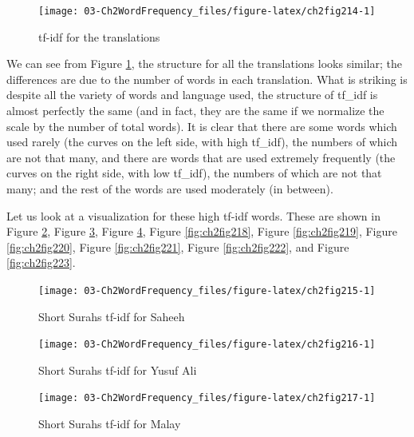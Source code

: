 \documentclass[
]{article}
\begin{document}
\normalsize

\begin{figure}

{\centering \texttt{[image: 03-Ch2WordFrequency\_files/figure-latex/ch2fig214-1]} 

}

\caption{tf-idf for the translations}\label{fig:ch2fig214}
\end{figure}

We can see from Figure \ref{fig:ch2fig214}, the structure for all the translations looks similar; the differences are due to the number of words in each translation. What is striking is despite all the variety of words and language used, the structure of tf\_idf is almost perfectly the same (and in fact, they are the same if we normalize the scale by the number of total words). It is clear that there are some words which used rarely (the curves on the left side, with high tf\_idf), the numbers of which are not that many, and there are words that are used extremely frequently (the curves on the right side, with low tf\_idf), the numbers of which are not that many; and the rest of the words are used moderately (in between).

Let us look at a visualization for these high tf-idf words. These are shown in Figure \ref{fig:ch2fig215}, Figure \ref{fig:ch2fig216}, Figure \ref{fig:ch2fig217}, Figure \ref{fig:ch2fig218}, Figure \ref{fig:ch2fig219}, Figure \ref{fig:ch2fig220}, Figure \ref{fig:ch2fig221}, Figure \ref{fig:ch2fig222}, and Figure \ref{fig:ch2fig223}.

\footnotesize

\normalsize

\begin{figure}

{\centering \texttt{[image: 03-Ch2WordFrequency\_files/figure-latex/ch2fig215-1]} 

}

\caption{Short Surahs tf-idf for Saheeh}\label{fig:ch2fig215}
\end{figure}

\begin{figure}

{\centering \texttt{[image: 03-Ch2WordFrequency\_files/figure-latex/ch2fig216-1]} 

}

\caption{Short Surahs tf-idf for Yusuf Ali}\label{fig:ch2fig216}
\end{figure}

\begin{figure}

{\centering \texttt{[image: 03-Ch2WordFrequency\_files/figure-latex/ch2fig217-1]} 

}

\caption{Short Surahs tf-idf for Malay}\label{fig:ch2fig217}
\end{figure}
\end{document}
